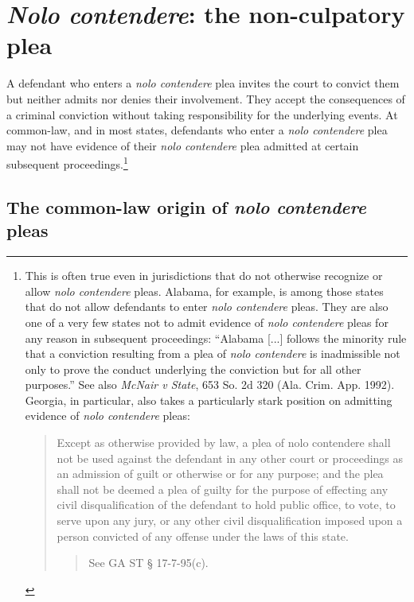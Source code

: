 \section{\textit{Nolo contendere}: the non-culpatory plea}

A defendant who enters a \textit{nolo contendere} plea invites the court to convict them but neither admits nor denies their involvement. They accept the consequences of a criminal conviction without taking responsibility for the underlying events. At common-law, and in most states, defendants who enter a \textit{nolo contendere} plea may not have evidence of their \textit{nolo contendere} plea admitted at certain subsequent proceedings.\footnote{This is often true even in jurisdictions that do not otherwise recognize or allow \textit{nolo contendere} pleas. Alabama, for example, is among those states that do not allow defendants to enter \textit{nolo contendere} pleas. They are also one of a very few states not to admit evidence of \textit{nolo contendere} pleas for any reason in subsequent proceedings: ``Alabama [...] follows the minority rule that a conviction resulting from a plea of \textit{nolo contendere} is inadmissible not only to prove the conduct underlying the conviction but for all other purposes.” See also \textit{McNair v State}, 653 So. 2d 320 (Ala. Crim. App. 1992). Georgia, in particular, also takes a particularly stark position on admitting evidence of \textit{nolo contendere} pleas:

\begin{quote}
    Except as otherwise provided by law, a plea of nolo contendere shall not be used against the defendant in any other court or proceedings as an admission of guilt or otherwise or for any purpose; and the plea shall not be deemed a plea of guilty for the purpose of effecting any civil disqualification of the defendant to hold public office, to vote, to serve upon any jury, or any other civil disqualification imposed upon a person convicted of any offense under the laws of this state.
    
    \begin{quote}
        See GA ST § 17-7-95(c).
    \end{quote}
    
\end{quote}}

\subsection{The common-law origin of \textit{nolo contendere} pleas}

